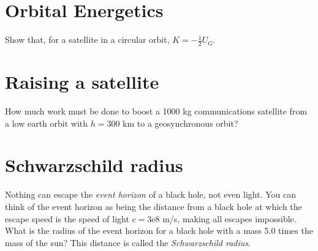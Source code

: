 \documentclass[11pt]{article}
\begin{document}
\section{Orbital Energetics}

Show that, for a satellite in a circular orbit, $K = -\frac{1}{2} U_G$.


\section{Raising a satellite}
How much work must be done to boost a 1000 kg communications satellite from a low earth orbit with $h = 300$ km to a geosynchronous orbit?



\section{Schwarzschild radius}

Nothing can escape the \textit{event horizon} of a black hole, not even light. You can think of the event horizon as being the distance from a black hole at which the escape speed is the speed of light $c = 3\text{e}8$ m/s, making all escapes impossible. What is the radius of the event horizon for a black hole with a mass 5.0 times the mass of the sun? This distance is called the \textit{Schwarzschild radius}.
\end{document}
